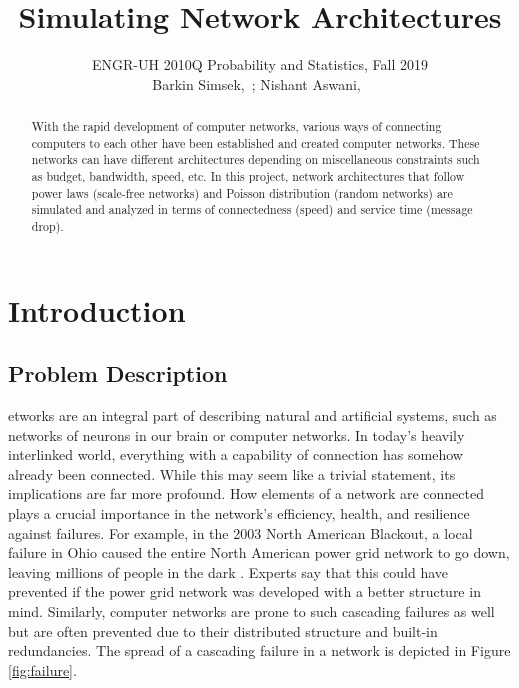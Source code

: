 \documentclass[journal]{IEEEtran}
\begin{document}
{}
\setcounter{page}{1}

\title{Simulating Network Architectures}

\author{ ENGR-UH 2010Q Probability and Statistics, Fall 2019\\
\medskip
Barkin Simsek,~;
Nishant Aswani,~}%


%
{}

\maketitle

\begin{abstract}
With the rapid development of computer networks, various ways of connecting computers to each other have been established and created computer networks. These networks can have different architectures depending on miscellaneous constraints such as budget, bandwidth, speed, etc. In this project, network architectures that follow power laws (scale-free networks) and Poisson distribution (random networks) are simulated and analyzed in terms of connectedness (speed) and service time (message drop).

\end{abstract}

\section{Introduction}
\subsection{Problem Description}
\lowercase{etworks} are an integral part of describing natural and artificial systems, such as networks of neurons in our brain or computer networks. In today's heavily interlinked world, everything with a capability of connection has somehow already been connected. While this may seem like a trivial statement, its implications are far more profound. How elements of a network are connected plays a crucial importance in the network's efficiency, health, and resilience against failures. For example, in the 2003 North American Blackout, a local failure in Ohio caused the entire North American power grid network to go down, leaving millions of people in the dark \cite[]{blackout}. Experts say that this could have prevented if the power grid network was developed with a better structure in mind. Similarly, computer networks are prone to such cascading failures as well but are often prevented due to their distributed structure and built-in redundancies. The spread of a cascading failure in a network is depicted in Figure \ref{fig:failure}. \\
\end{document}
